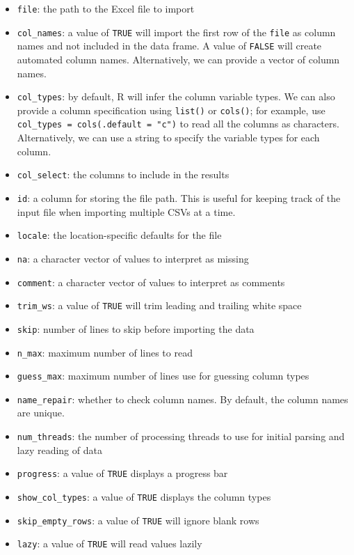 \documentclass[
]{krantz}
\providecommand{\tightlist}{%
  \setlength{\itemsep}{0pt}\setlength{\parskip}{0pt}}
\begin{document}
\begin{itemize}
\tightlist
\item
  \texttt{file}: the path to the Excel file to import
\item
  \texttt{col\_names}: a value of \texttt{TRUE} will import the first row of the \texttt{file} as column names and not included in the data frame. A value of \texttt{FALSE} will create automated column names. Alternatively, we can provide a vector of column names.
\item
  \texttt{col\_types}: by default, R will infer the column variable types. We can also provide a column specification using \texttt{list()} or \texttt{cols()}; for example, use \texttt{col\_types\ =\ cols(.default\ =\ "c")} to read all the columns as characters. Alternatively, we can use a string to specify the variable types for each column.
\item
  \texttt{col\_select}: the columns to include in the results
\item
  \texttt{id}: a column for storing the file path. This is useful for keeping track of the input file when importing multiple CSVs at a time.
\item
  \texttt{locale}: the location-specific defaults for the file
\item
  \texttt{na}: a character vector of values to interpret as missing
\item
  \texttt{comment}: a character vector of values to interpret as comments
\item
  \texttt{trim\_ws}: a value of \texttt{TRUE} will trim leading and trailing white space
\item
  \texttt{skip}: number of lines to skip before importing the data
\item
  \texttt{n\_max}: maximum number of lines to read
\item
  \texttt{guess\_max}: maximum number of lines use for guessing column types
\item
  \texttt{name\_repair}: whether to check column names. By default, the column names are unique.
\item
  \texttt{num\_threads}: the number of processing threads to use for initial parsing and lazy reading of data
\item
  \texttt{progress}: a value of \texttt{TRUE} displays a progress bar
\item
  \texttt{show\_col\_types}: a value of \texttt{TRUE} displays the column types
\item
  \texttt{skip\_empty\_rows}: a value of \texttt{TRUE} will ignore blank rows
\item
  \texttt{lazy}: a value of \texttt{TRUE} will read values lazily
\end{itemize}
\end{document}
